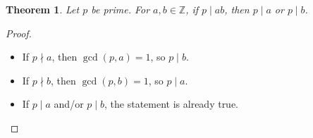 \documentclass[hidelinks]{article}
\theoremstyle{mystyle}
\newtheorem{theorem}{Theorem}[section]
\begin{document}
\begin{theorem}
Let $p$ be prime. For $a,b \in \mathbb{Z}$, if $p \mid ab$, then $p \mid a$ or $p \mid b$.
\end{theorem}

\begin{proof}
\begin{itemize}
    \item If $p \nmid a$, then $\gcd(p,a)=1$, so $p \mid b$.
    \item If $p \nmid b$, then $\gcd(p,b)=1$, so $p \mid a$.
    \item If $p \mid a$ and/or $p \mid b$, the statement is already true.
\end{itemize}
\end{proof}
\end{document}
